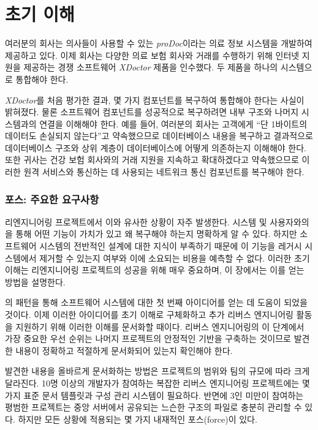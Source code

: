 \documentclass[a4paper,10pt,twoside]{book}
\begin{document}
	\renewcommand{\nnbb}[2]{} %
	\sloppy
\fi
\chapter{초기 이해}

여러분의 회사는 의사들이 사용할 수 있는 \emph{proDoc}이라는 의료 정보 시스템을 개발하여 제공하고 있다. 이제 회사는 다양한 의료 보험 회사와 거래를 수행하기 위해 인터넷 지원을 제공하는 경쟁 소프트웨어 \emph{XDoctor} 제품을 인수했다. 두 제품을 하나의 시스템으로 통합해야 한다.

\emph{XDoctor}를 처음 평가한 결과, 몇 가지 컴포넌트를 복구하여 통합해야 한다는 사실이 밝혀졌다. 물론 소프트웨어 컴포넌트를 성공적으로 복구하려면 내부 구조와 나머지 시스템과의 연결을 이해해야 한다. 예를 들어, 여러분의 회사는 고객에게 ``단 1바이트의 데이터도 손실되지 않는다''고 약속했으므로 데이터베이스 내용을 복구하고 결과적으로 데이터베이스 구조와 상위 계층이 데이터베이스에 어떻게 의존하는지 이해해야 한다. 또한 귀사는 건강 보험 회사와의 거래 지원을 지속하고 확대하겠다고 약속했으므로 이러한 원격 서비스와 통신하는 데 사용되는 네트워크 통신 컴포넌트를 복구해야 한다.

\subsection*{포스: 주요한 요구사항}

리엔지니어링 프로젝트에서 이와 유사한 상황이 자주 발생한다. 시스템 및 사용자와의 을 통해 어떤 기능이 가치가 있고 왜 복구해야 하는지 명확하게 알 수 있다. 하지만 소프트웨어 시스템의 전반적인 설계에 대한 지식이 부족하기 때문에 이 기능을 레거시 시스템에서 제거할 수 있는지 여부와 이에 소요되는 비용을 예측할 수 없다. 이러한 초기 이해는 리엔지니어링 프로젝트의 성공을 위해 매우 중요하며, 이 장에서는 이를 얻는 방법을 설명한다.

의 패턴을 통해 소프트웨어 시스템에 대한 첫 번째 아이디어를 얻는 데 도움이 되었을 것이다. 이제 이러한 아이디어를 초기 이해로 구체화하고 추가 리버스 엔지니어링 활동을 지원하기 위해 이러한 이해를 문서화할 때이다. 리버스 엔지니어링의 이 단계에서 가장 중요한 우선 순위는 나머지 프로젝트의 안정적인 기반을 구축하는 것이므로 발견한 내용이 정확하고 적절하게 문서화되어 있는지 확인해야 한다.

발견한 내용을 올바르게 문서화하는 방법은 프로젝트의 범위와 팀의 규모에 따라 크게 달라진다. 10명 이상의 개발자가 참여하는 복잡한 리버스 엔지니어링 프로젝트에는 몇 가지 표준 문서 템플릿과 구성 관리 시스템이 필요하다. 반면에 3인 미만이 참여하는 평범한 프로젝트는 중앙 서버에서 공유되는 느슨한 구조의 파일로 충분히 관리할 수 있다. 하지만 모든 상황에 적용되는 몇 가지 내재적인 포스(force)이 있다.
\end{document}
